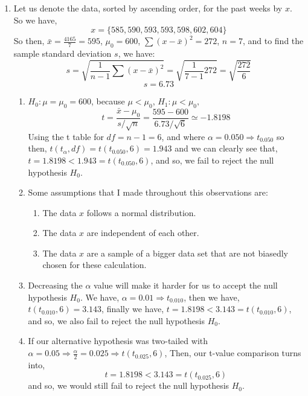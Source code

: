 \documentclass[12pt]{article}
\begin{document}
\begin{enumerate}
\begin{proof}
			$\therefore$ We have shown that $X$ and $Y$ are dependent, but they have zero covariance.
		\end{proof}
		\item Let us denote the data, sorted by ascending order, for the past weeks by $x$. So we have, 
		$$x = \{585, 590, 593, 593, 598, 602, 604\}$$
		So then, $\bar{x} = \frac{4165}{7} = 595$, $\mu_0 = 600$, $\sum (x - \bar{x})^2 = 272$, $n = 7$, and to find the sample standard deviation $s$, we have:
		$$s = \sqrt{\frac{1}{n - 1} \sum (x - \bar{x})^2} = \sqrt{\frac{1}{7 - 1} 272} = \sqrt{\frac{272}{6} }$$
		$$s = 6.73$$
		\begin{enumerate}
			\item $H_0 : \mu = \mu_0 = 600$, because $\mu < \mu_0$, $H_1 : \mu < \mu_0,$ 
				$$t = \frac{\bar{x} - \mu_0}{s / \sqrt{n}} = \frac{595 - 600}{6.73 / \sqrt{6}} \simeq -1.8198$$
				Using the t table for $df = n - 1 = 6$, and where $\alpha = 0.050 \Rightarrow t_{0.050}$ so then, $t(t_{\alpha}, df) = t(t_{0.050}, 6) = 1.943$ and we can clearly see that, $t = 1.8198 < 1.943 = t(t_{0.050}, 6)$, and so, we fail to reject the null hypothesis $H_0$.
			\item Some assumptions that I made throughout this observations are:
				\begin{enumerate}
					\item The data $x$ follows a normal distribution.
					\item The data $x$ are independent of each other.
					\item The data $x$ are a sample of a bigger data set that are not biasedly chosen for these calculation.
				\end{enumerate}
			\item Decreasing the $\alpha$ value will make it harder for us to accept the null hypothesis $H_0$. We have, $\alpha = 0.01 \Rightarrow t_{0.010}$, then we have, $t(t_{0.010}, 6) = 3.143$, finally we have, $t = 1.8198 < 3.143 = t(t_{0.010}, 6)$, and so, we also fail to reject the null hypothesis $H_0$.
			
			\item If our alternative hypothesis was two-tailed
with $\alpha = 0.05 \Rightarrow \frac{\alpha}{2} = 0.025 \Rightarrow t(t_{0.025}, 6)$, Then, our t-value comparison turns into,
			$$t = 1.8198 < 3.143 = t(t_{0.025}, 6)$$
			and so, we would still fail to reject the null hypothesis $H_0$.
			

\end{enumerate}
\end{enumerate}
\end{document}
